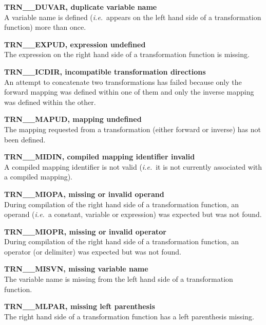 \documentclass[twoside,11pt]{article}
\begin{document}
\begin{description}
\item \textbf{TRN\_\_DUVAR, duplicate variable name}\\
A variable name is defined (\emph{i.e.}\ appears on the left hand side of a
transformation function) more than once. 

\item \textbf{TRN\_\_EXPUD, expression undefined}\\
The expression on the right hand side of a transformation function is
missing. 

\item \textbf{TRN\_\_ICDIR, incompatible transformation directions}\\
An attempt to concatenate two transformations has failed because only the 
forward mapping was defined within one of them and only the inverse mapping 
was defined within the other.

\item \textbf{TRN\_\_MAPUD, mapping undefined}\\
The mapping requested from a transformation (either forward or inverse) has
not been defined. 

\item \textbf{TRN\_\_MIDIN, compiled mapping identifier invalid}\\
A compiled mapping identifier is not valid (\emph{i.e.}\ it is not currently
associated with a compiled mapping). 

\item \textbf{TRN\_\_MIOPA, missing or invalid operand}\\
During compilation of the right hand side of a transformation function, an
operand (\emph{i.e.}\ a constant, variable or expression) was expected but was
not found. 

\item \textbf{TRN\_\_MIOPR, missing or invalid operator}\\
During compilation of the right hand side of a transformation function, an
operator (or delimiter) was expected but was not found. 

\item \textbf{TRN\_\_MISVN, missing variable name}\\
The variable name is missing from the left hand side of a transformation
function. 

\item \textbf{TRN\_\_MLPAR, missing left parenthesis}\\
The right hand side of a transformation function has a left parenthesis
missing. 


\end{description}
\end{document}
